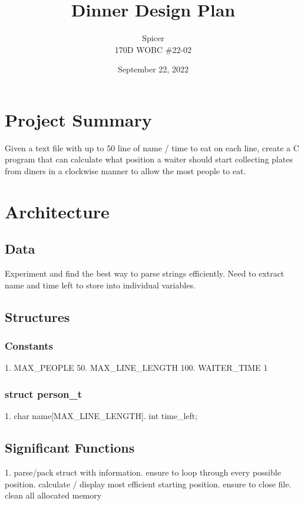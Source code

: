 \documentclass[12pt]{article}
\begin{document}
\title{Dinner Design Plan}
\author{\Kyle Spicer\\ 170D WOBC \#22-02}
\date{September 22, 2022}

\maketitle

\section{Project Summary}\label{Project Summary}
Given a text file with up to 50 line of name / time to eat on each line, create a C program that can calculate what position a waiter should start collecting plates from diners in a clockwise manner to allow the most people to eat.

\section{Architecture}\label{Architechture}

\subsection{Data}
    Experiment and find the best way to parse strings efficiently. Need to extract name and time left to store into individual variables.

\subsection{Structures}
\subsubsection{Constants}
1. MAX\_PEOPLE 50. MAX\_LINE\_LENGTH 100. WAITER\_TIME 1

\subsubsection{struct person\_t}
1. char name[MAX\_LINE\_LENGTH]. int time\_left;

\subsection{Significant Functions}
1.  parse/pack struct with information.  ensure to loop through every possible position.  calculate / display most efficient starting position.  ensure to close file.  clean all allocated memory
\end{document}
